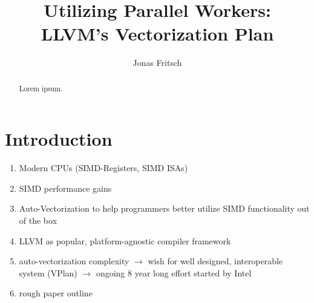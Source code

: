 \documentclass[sigplan,11pt,nonacm]{acmart}
\begin{document}
\title{Utilizing Parallel Workers: \\LLVM's Vectorization Plan}
\author{Jonas Fritsch}

\begin{abstract}
Lorem ipsum.
\end{abstract}

\maketitle



\section{Introduction}
\label{sec:introduction}

\begin{enumerate}
  \item Modern CPUs (SIMD-Registers, SIMD ISAs)
  \item SIMD performance gains
  \item Auto-Vectorization to help programmers better utilize SIMD functionality out of the box
  \item LLVM as popular, platform-agnostic compiler framework
  \item auto-vectorization complexity $\rightarrow$ wish for well designed, 
  interoperable system (VPlan) $\rightarrow$ ongoing 8 year long effort started by Intel
  \item rough paper outline
\end{enumerate}


\end{document}
